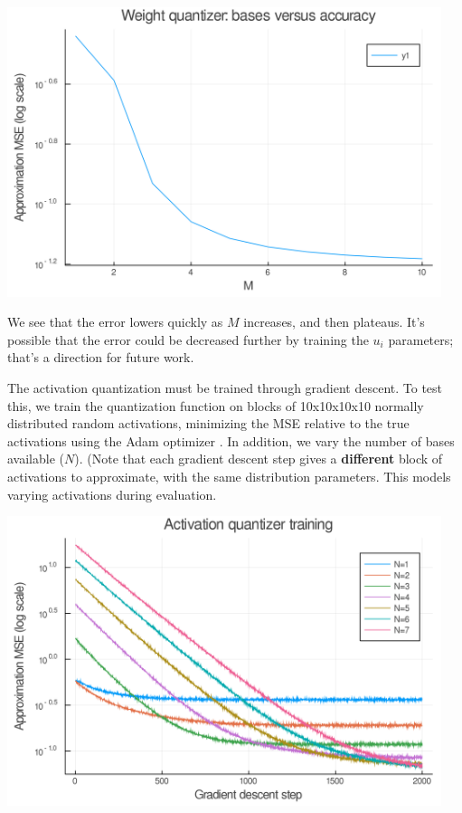 \documentclass[12pt]{article}
\begin{document}
\begin{center}
\includegraphics[width=5in]{./plots/weighttraining.png}
\end{center}

We see that the error lowers quickly as \(M\) increases, and then plateaus. It's possible that
the error could be decreased further by training the \(u_i\) parameters; that's a direction for future work.

The activation quantization must be trained through gradient descent. To test this, we train the quantization function on blocks of 10x10x10x10 normally distributed random activations, minimizing the MSE relative to the true activations using the Adam optimizer \citep{Adam}. In addition, we vary the number of bases available (\(N\)). (Note that each gradient descent step gives a \textbf{different} block of activations to approximate, with the same distribution parameters. This models varying activations during evaluation.

\begin{center}
\includegraphics[width=5in]{./plots/acttraining.png}
\end{center}
\end{document}
